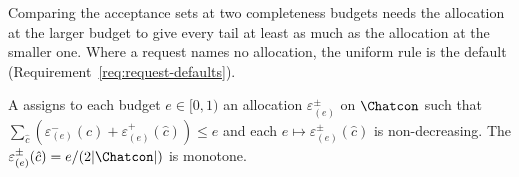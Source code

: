 
Comparing the acceptance sets at two completeness budgets needs the
allocation at the larger budget to give every tail at least as much as the
allocation at the smaller one. Where a request names no allocation, the
uniform rule is the default (Requirement~\ref{req:request-defaults}).

\begin{definition}\label{def:monotone-rule}
A 
assigns to each budget $e\in[0,1)$ an allocation
$\varepsilon^{\pm}_{(e)}$ on $\Chatcon$ such that
$\sum_{\hat c}(\varepsilon^{-}_{(e)}(\hat c)+\varepsilon^{+}_{(e)}(\hat c))\le
e$ and each $e\mapsto\varepsilon^{\pm}_{(e)}(\hat c)$ is non-decreasing. The
$\varepsilon^{\pm}_{(e)}(\hat c)=e/(2|\Chatcon|)$ is monotone.
\end{definition}
